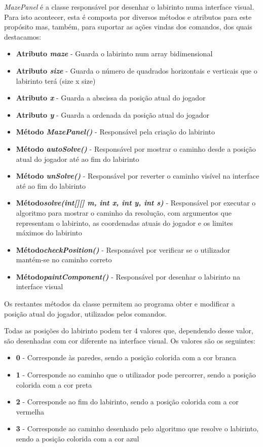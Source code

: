 \documentclass[10pt,portuguese]{article}
\begin{document}
\par \textit{MazePanel} é a classe responsável por desenhar o labirinto numa interface visual. Para isto acontecer, esta é composta por diversos métodos e atributos para este propósito mas, também, para suportar as ações vindas dos comandos, dos quais destacamos:

\begin{itemize}
    \item \textbf{Atributo \textit{maze}} - Guarda o labirinto num array bidimensional
    \item \textbf{Atributo \textit{size}} - Guarda o número de quadrados horizontais e verticais que o labirinto terá (size x size)
    \item \textbf{Atributo \textit{x}} - Guarda a abscissa da posição atual do jogador
    \item \textbf{Atributo \textit{y}} - Guarda a ordenada da posição atual do jogador
    \item \textbf{Método \textit{MazePanel()}} - Responsável pela criação do labirinto
    \item \textbf{Método \textit{autoSolve()}} - Responsável por mostrar o caminho desde a posição atual do jogador até ao fim do labirinto
    \item \textbf{Método \textit{unSolve()}} - Responsável por reverter o caminho visível na interface até ao fim do labirinto
    \item \textbf{Método\textit{solve(int[][] m, int x, int y, int s)}} - Responsável por executar o algoritmo para mostrar o caminho da resolução, com argumentos que representam o labirinto, as coordenadas atuais do jogador e os limites máximos do labirinto
    \item \textbf{Método\textit{checkPosition()}} - Responsável por verificar se o utilizador mantém-se no caminho correto
     \item \textbf{Método\textit{paintComponent()}} - Responsável por desenhar o labirinto na interface visual
\end{itemize}

\par Os restantes métodos da classe permitem ao programa obter e modificar a posição atual do jogador, utilizados pelos comandos. 

\par Todas as posições do labirinto podem ter 4 valores que, dependendo desse valor, são desenhadas com cor diferente na interface visual. Os valores são os seguintes:

\begin{itemize}
    \item \textbf{0} - Corresponde às paredes, sendo a posição colorida com a cor branca
    \item \textbf{1} - Corresponde ao caminho que o utilizador pode percorrer, sendo a posição colorida com a cor preta
    \item \textbf{2} - Corresponde ao fim do labirinto, sendo a posição colorida com a cor vermelha
    \item \textbf{3} - Corresponde ao caminho desenhado pelo algoritmo que resolve o labirinto, sendo a posição colorida com a cor azul
\end{itemize}
\end{document}
